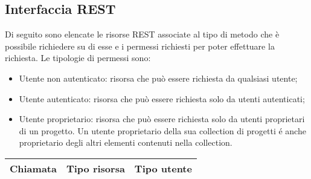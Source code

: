 \subsection{Interfaccia REST}
Di seguito sono elencate le risorse REST associate al tipo di metodo che è possibile richiedere su di esse e i permessi richiesti per poter effettuare la richiesta.
Le tipologie di permessi sono:
\begin{itemize}
	\item Utente non autenticato: risorsa che può essere richiesta da qualsiasi utente;
	\item Utente autenticato: risorsa che può essere richiesta solo da utenti autenticati;
	\item Utente proprietario: risorsa che può essere richiesta solo da utenti proprietari di un progetto. Un utente proprietario della sua collection di progetti é anche proprietario degli altri elementi contenuti nella collection.
\end{itemize}

\begin{table}[h]
	\begin{tabular}{|p{}|p{}|p{}|}
		\toprule
		
		\textbf{Chiamata} & \textbf{Tipo risorsa}  & \textbf{Tipo utente} \\
		\bottomrule
	\end{tabular}\\	
\end{table}

